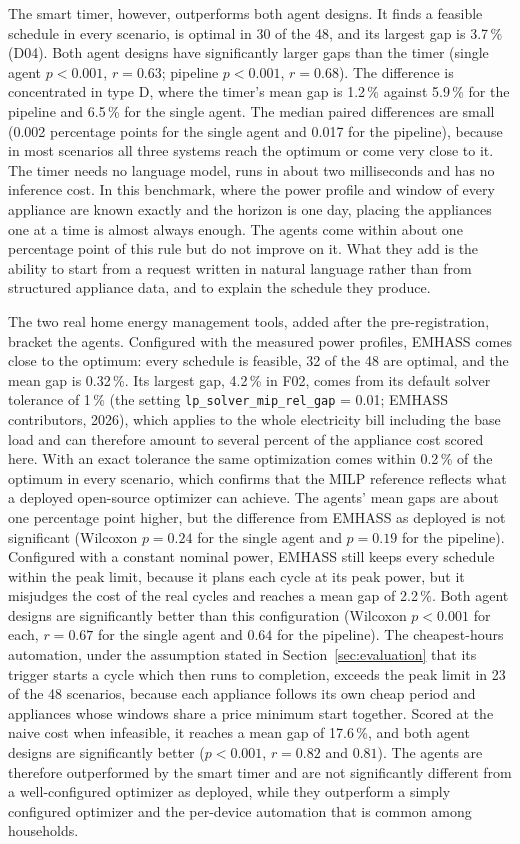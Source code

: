 The smart timer, however, outperforms both agent designs. It finds a
feasible schedule in every scenario, is optimal in 30 of the 48, and its
largest gap is 3.7\,\% (D04). Both agent designs have significantly
larger gaps than the timer (single agent $p < 0.001$, $r = 0.63$;
pipeline $p < 0.001$, $r = 0.68$). The difference is concentrated in
type D, where the timer's mean gap is 1.2\,\% against 5.9\,\% for the
pipeline and 6.5\,\% for the single agent. The median paired differences
are small (0.002 percentage points for the single agent and 0.017 for the
pipeline), because in most scenarios all three systems reach the optimum
or come very close to it. The timer needs no language model, runs in
about two milliseconds and has no inference cost. In this benchmark,
where the power profile and window of every appliance are known exactly
and the horizon is one day, placing the appliances one at a time is
almost always enough. The agents come within about one percentage point
of this rule but do not improve on it. What they add is the ability to
start from a request written in natural language rather than from
structured appliance data, and to explain the schedule they produce.

The two real home energy management tools, added after the
pre-registration, bracket the agents. Configured with the measured power
profiles, EMHASS comes close to the optimum: every schedule is feasible,
32 of the 48 are optimal, and the mean gap is 0.32\,\%. Its largest gap,
4.2\,\% in F02, comes from its default solver tolerance of 1\,\%
(the setting \texttt{lp\_solver\_mip\_rel\_gap} = 0.01; EMHASS
contributors, 2026), which
applies to the whole electricity bill including the base load and can
therefore amount to several percent of the appliance cost scored here.
With an exact tolerance the same optimization comes within 0.2\,\% of
the optimum in every scenario, which confirms that the MILP reference reflects what a
deployed open-source optimizer can achieve. The agents' mean gaps are
about one percentage point higher, but the difference from EMHASS as
deployed is not significant (Wilcoxon $p = 0.24$ for the single agent and
$p = 0.19$ for the pipeline). Configured with a constant nominal power,
EMHASS still keeps every schedule within the peak limit, because it
plans each cycle at its peak power, but it misjudges the cost of the real
cycles and reaches a mean gap of 2.2\,\%. Both agent designs are
significantly better than this configuration (Wilcoxon $p < 0.001$ for
each, $r = 0.67$ for the single agent and $0.64$ for the pipeline). The
cheapest-hours automation, under the assumption stated in
Section~\ref{sec:evaluation} that its trigger starts a cycle which then
runs to completion, exceeds the peak limit in 23 of the 48 scenarios,
because each appliance follows
its own cheap period and appliances whose windows share a price minimum
start together. Scored at the naive cost when infeasible, it reaches a
mean gap of 17.6\,\%, and both agent designs are significantly better
($p < 0.001$, $r = 0.82$ and $0.81$). The agents are therefore
outperformed by the smart timer and are not significantly different from
a well-configured optimizer as deployed, while they outperform a simply
configured optimizer and the per-device automation that is common among
households.

